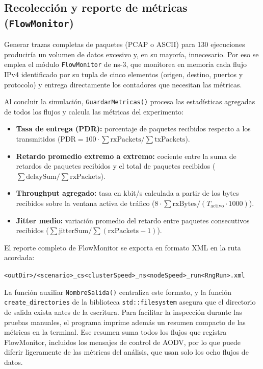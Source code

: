 \subsection{Recolección y reporte de métricas (\texttt{FlowMonitor})}

Generar trazas completas de paquetes (PCAP o ASCII) para 130 ejecuciones produciría un volumen de datos excesivo y, en su mayoría, innecesario. Por eso se emplea el módulo \texttt{FlowMonitor} de ns-3, que monitorea en memoria cada flujo IPv4 identificado por su tupla de cinco elementos (origen, destino, puertos y protocolo) y entrega directamente los contadores que necesitan las métricas.

Al concluir la simulación, \texttt{GuardarMetricas()} procesa las estadísticas agregadas de todos los flujos y calcula las métricas del experimento:
\begin{itemize}
    \item \textbf{Tasa de entrega (PDR):} porcentaje de paquetes recibidos respecto a los transmitidos ($\text{PDR} = 100 \cdot \sum \text{rxPackets} / \sum \text{txPackets}$).
    \item \textbf{Retardo promedio extremo a extremo:} cociente entre la suma de retardos de paquetes recibidos y el total de paquetes recibidos ($\sum \text{delaySum} / \sum \text{rxPackets}$).
    \item \textbf{Throughput agregado:} tasa en kbit/s calculada a partir de los bytes recibidos sobre la ventana activa de tráfico ($8 \cdot \sum \text{rxBytes} / (T_{\text{activo}} \cdot 1000)$).
    \item \textbf{Jitter medio:} variación promedio del retardo entre paquetes consecutivos recibidos ($\sum \text{jitterSum} / \sum (\text{rxPackets} - 1)$).
\end{itemize}

El reporte completo de FlowMonitor se exporta en formato XML en la ruta acordada:
\begin{center}
\texttt{<outDir>/<scenario>\_cs<clusterSpeed>\_ns<nodeSpeed>\_run<RngRun>.xml}
\end{center}
La función auxiliar \texttt{NombreSalida()} centraliza este formato, y la función \texttt{create\_\allowbreak{}directories} de la biblioteca \texttt{std::\allowbreak{}filesystem} asegura que el directorio de salida exista antes de la escritura. Para facilitar la inspección durante las pruebas manuales, el programa imprime además un resumen compacto de las métricas en la terminal. Ese resumen suma todos los flujos que registra FlowMonitor, incluidos los mensajes de control de AODV, por lo que puede diferir ligeramente de las métricas del análisis, que usan solo los ocho flujos de datos.

